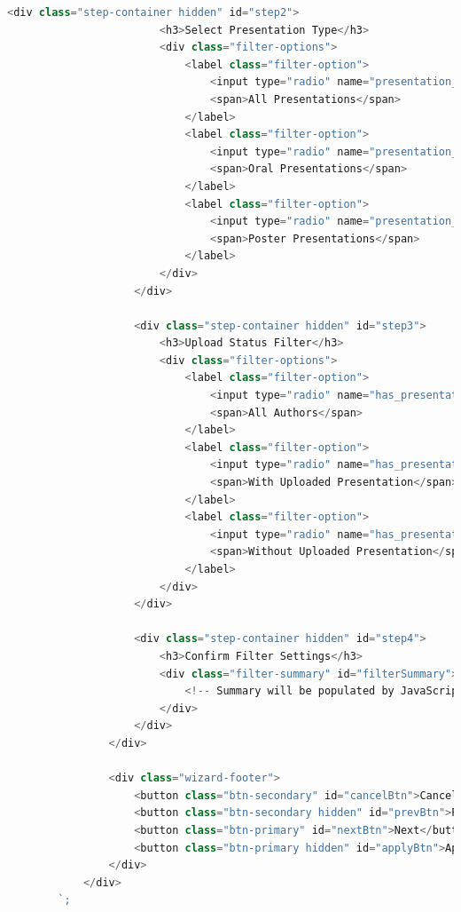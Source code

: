 \documentclass[11pt,a4paper]{article}
\begin{document}
\begin{lstlisting}[language=JavaScript, caption=Filter-Wizard Implementation]
                    <div class="step-container hidden" id="step2">
                        <h3>Select Presentation Type</h3>
                        <div class="filter-options">
                            <label class="filter-option">
                                <input type="radio" name="presentation_type" value="all" checked>
                                <span>All Presentations</span>
                            </label>
                            <label class="filter-option">
                                <input type="radio" name="presentation_type" value="oral">
                                <span>Oral Presentations</span>
                            </label>
                            <label class="filter-option">
                                <input type="radio" name="presentation_type" value="poster">
                                <span>Poster Presentations</span>
                            </label>
                        </div>
                    </div>
                    
                    <div class="step-container hidden" id="step3">
                        <h3>Upload Status Filter</h3>
                        <div class="filter-options">
                            <label class="filter-option">
                                <input type="radio" name="has_presentation" value="all" checked>
                                <span>All Authors</span>
                            </label>
                            <label class="filter-option">
                                <input type="radio" name="has_presentation" value="with">
                                <span>With Uploaded Presentation</span>
                            </label>
                            <label class="filter-option">
                                <input type="radio" name="has_presentation" value="without">
                                <span>Without Uploaded Presentation</span>
                            </label>
                        </div>
                    </div>
                    
                    <div class="step-container hidden" id="step4">
                        <h3>Confirm Filter Settings</h3>
                        <div class="filter-summary" id="filterSummary">
                            <!-- Summary will be populated by JavaScript -->
                        </div>
                    </div>
                </div>
                
                <div class="wizard-footer">
                    <button class="btn-secondary" id="cancelBtn">Cancel</button>
                    <button class="btn-secondary hidden" id="prevBtn">Previous</button>
                    <button class="btn-primary" id="nextBtn">Next</button>
                    <button class="btn-primary hidden" id="applyBtn">Apply Filters</button>
                </div>
            </div>
        `;
        

\end{lstlisting}
\end{document}
